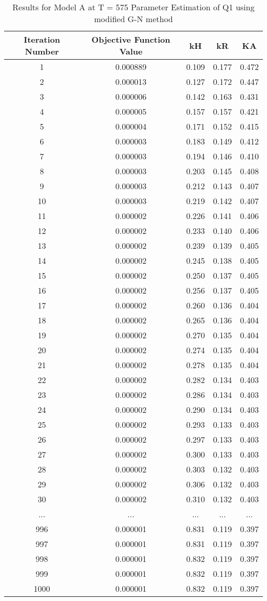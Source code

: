 \documentclass[a4paper,12pt]{article} %
\begin{document}
\begin{table}[ht]
    \caption{Results for Model A at T = 575 Parameter Estimation of Q1 using modified G-N method}
    \centering
    \begin{tabular}{|c|c|c|c|c|}
        \hline
        Iteration Number & Objective Function Value & kH & kR & KA \\
        \hline
        1 & 0.000889 & 0.109 & 0.177 & 0.472 \\
2 & 0.000013 & 0.127 & 0.172 & 0.447 \\
3 & 0.000006 & 0.142 & 0.163 & 0.431 \\
4 & 0.000005 & 0.157 & 0.157 & 0.421 \\
5 & 0.000004 & 0.171 & 0.152 & 0.415 \\
6 & 0.000003 & 0.183 & 0.149 & 0.412 \\
7 & 0.000003 & 0.194 & 0.146 & 0.410 \\
8 & 0.000003 & 0.203 & 0.145 & 0.408 \\
9 & 0.000003 & 0.212 & 0.143 & 0.407 \\
10 & 0.000003 & 0.219 & 0.142 & 0.407 \\
11 & 0.000002 & 0.226 & 0.141 & 0.406 \\
12 & 0.000002 & 0.233 & 0.140 & 0.406 \\
13 & 0.000002 & 0.239 & 0.139 & 0.405 \\
14 & 0.000002 & 0.245 & 0.138 & 0.405 \\
15 & 0.000002 & 0.250 & 0.137 & 0.405 \\
16 & 0.000002 & 0.256 & 0.137 & 0.405 \\
17 & 0.000002 & 0.260 & 0.136 & 0.404 \\
18 & 0.000002 & 0.265 & 0.136 & 0.404 \\
19 & 0.000002 & 0.270 & 0.135 & 0.404 \\
20 & 0.000002 & 0.274 & 0.135 & 0.404 \\
21 & 0.000002 & 0.278 & 0.135 & 0.404 \\
22 & 0.000002 & 0.282 & 0.134 & 0.403 \\
23 & 0.000002 & 0.286 & 0.134 & 0.403 \\
24 & 0.000002 & 0.290 & 0.134 & 0.403 \\
25 & 0.000002 & 0.293 & 0.133 & 0.403 \\
26 & 0.000002 & 0.297 & 0.133 & 0.403 \\
27 & 0.000002 & 0.300 & 0.133 & 0.403 \\
28 & 0.000002 & 0.303 & 0.132 & 0.403 \\
29 & 0.000002 & 0.306 & 0.132 & 0.403 \\
30 & 0.000002 & 0.310 & 0.132 & 0.403 \\
... & ... & ... & ... & ... \\
996 & 0.000001 & 0.831 & 0.119 & 0.397 \\
997 & 0.000001 & 0.831 & 0.119 & 0.397 \\
998 & 0.000001 & 0.832 & 0.119 & 0.397 \\
999 & 0.000001 & 0.832 & 0.119 & 0.397 \\
1000 & 0.000001 & 0.832 & 0.119 & 0.397 \\


\end{tabular}
\end{table}
\end{document}

